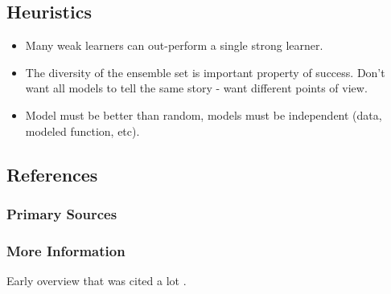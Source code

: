 \begin{bibunit}
\subsection{Heuristics}


\begin{itemize}
	\item Many weak learners can out-perform a single strong learner.
	\item The diversity of the ensemble set is important property of success. Don't want all models to tell the same story - want different points of view.
	\item Model must be better than random, models must be independent (data, modeled function, etc).
\end{itemize}


\subsection{References}

\subsubsection{Primary Sources}



\subsubsection{More Information}

Early overview that was cited a lot \cite{Dietterich2000}.

\putbib
\end{bibunit}


